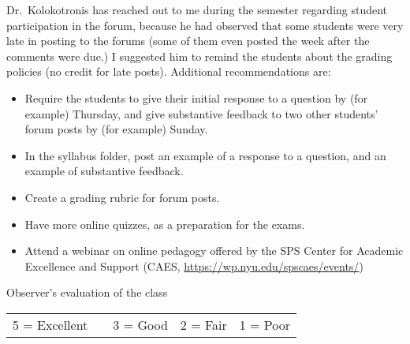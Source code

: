 \documentclass[11pt,dvipsnames]{article}
\begin{document}
Dr.~Kolokotronis has reached out to me during the semester regarding student participation in the forum, because he had observed that some students were very late in posting to the forums (some of them even posted the week after the comments were due.) I suggested him to remind the students about the grading policies (no credit for late posts). Additional recommendations are:
\begin{itemize}
	\item Require the students to give their initial response to a question by (for example) Thursday, and give substantive feedback to two other students' forum posts by (for example) Sunday.
	\item In the syllabus folder, post an example of a response to a question, and an example of substantive feedback.
	\item Create a grading rubric for forum posts.
	\item Have more online quizzes, as a preparation for the exams. 
	\item Attend a webinar on online pedagogy offered by the SPS Center for Academic Excellence and Support (CAES, \url{https://wp.nyu.edu/spscaes/events/})
	
	
\end{itemize}
\vskip 1cm
{\large Observer's evaluation of the class}

{\tabulinesep=1.2mm
	\begin{tabu}{c  c c c c  }
		
		5 = Excellent   & {} & 3 = Good & 2 = Fair & 1 = Poor   \\ 	
	\end{tabu}}
\end{document}
